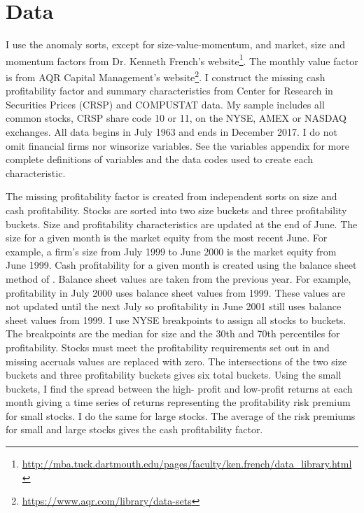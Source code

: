 
\section*{Data}

I use the anomaly sorts, except for size-value-momentum, and market, size and
momentum factors from Dr. Kenneth French's website\footnote{
\url{http://mba.tuck.dartmouth.edu/pages/faculty/ken.french/data_library.html}
}. The monthly value factor is from AQR Capital Management's website\footnote{
\url{https://www.aqr.com/library/data-sets}
}.
I construct the missing cash profitability factor and summary characteristics
from Center for Research in Securities Prices (CRSP) and COMPUSTAT data. My
sample includes all common stocks, CRSP share code 10 or 11, on the NYSE, AMEX
or NASDAQ exchanges. All data begins in July 1963 and ends in December 2017. I
do not omit financial firms nor winsorize variables. See the variables appendix
for more complete definitions of variables and the data codes used to create
each characteristic.

The missing profitability factor is created from independent sorts on size and
cash profitability. Stocks are sorted into two size buckets and three
profitability buckets. Size and profitability characteristics are updated at
the end of June. The size for a given month is the market equity from the most
recent June. For example, a firm’s size from July 1999 to June 2000 is the
market equity from June 1999. Cash profitability for a given month is created
using the balance sheet method of \textcite{ball2016accruals}. Balance sheet
values are taken from the previous year. For example, profitability in July
2000 uses balance sheet values from 1999. These values are not updated until
the next July so profitability in June 2001 still uses balance sheet values
from 1999. I use NYSE breakpoints to assign all stocks to buckets. The
breakpoints are the median for size and the 30th and 70th percentiles for
profitability. Stocks must meet the profitability requirements set out in
\textcite{fama2015five} and missing accruals values are replaced with zero. The
intersections of the two size buckets and three profitability buckets gives six
total buckets. Using the small buckets, I find the spread between the high-
profit and low-profit returns at each month giving a time series of returns
representing the profitability risk premium for small stocks. I do the same for
large stocks. The average of the risk premiums for small and large stocks gives
the cash profitability factor.

